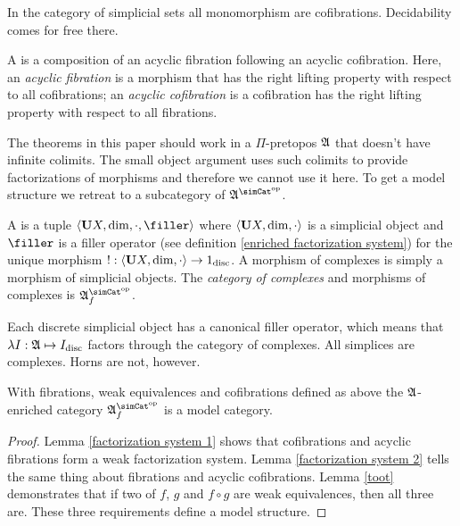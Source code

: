 \documentclass[csh.tex]{subfiles}
\begin{document}
In the category of simplicial sets all monomorphism are cofibrations. Decidability comes for free there.

\begin{definition} A  is a composition of an acyclic fibration following an acyclic cofibration. Here, an \emph{acyclic fibration} is a morphism that has the right lifting property with respect to all cofibrations; an \emph{acyclic cofibration} is a cofibration has the right lifting property with respect to all fibrations.
\end{definition}

The theorems in this paper should work in a $\Pi$-pretopos $\mathfrak A$ that doesn't have infinite colimits. The small object argument uses such colimits to provide factorizations of morphisms and therefore we cannot use it here. To get a model structure we retreat to a subcategory of $\ambient\s$.

\begin{definition} A  is a tuple $\tuplet{\base X,\dim,\cdot,\filler}$ where $\left\langle \mathbf{U} X,\dim,\cdot \right\rangle$ is a simplicial object and $\filler$ is a filler operator (see definition \ref{enriched factorization system}) for the unique morphism $!: \left\langle \mathbf{U} X,\dim,\cdot \right\rangle\to 1_{\rm disc}$. A morphism of complexes is simply a morphism of simplicial objects. The \emph{category of complexes} and morphisms of complexes is $\ambient\s\f$.
\end{definition}

\begin{example} Each discrete simplicial object has a canonical filler operator, which means that $\lambda I:\mathfrak A \mapsto I_{\rm disc}$ factors through the category of complexes. All simplices are complexes. Horns are not, however.
\end{example}

\begin{theorem}
With fibrations, weak equivalences and cofibrations defined as above the $\mathfrak A$-enriched category $\ambient\s\f$ is a model category.
\label{model category}
\end{theorem}

\begin{proof}
Lemma \ref{factorization system 1} shows that cofibrations and acyclic fibrations form a weak factorization system. Lemma \ref{factorization system 2} tells the same thing about fibrations and acyclic cofibrations. Lemma \ref{toot} demonstrates that if two of $f$, $g$ and $f\circ g$ are weak equivalences, then all three are. These three requirements define a model structure.
\end{proof}
\end{document}

